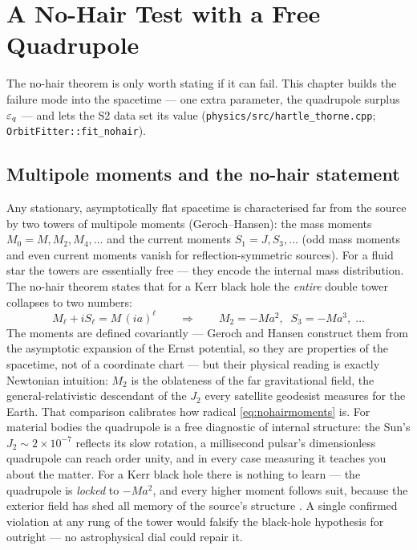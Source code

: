 \chapter{A No-Hair Test with a Free Quadrupole}
\label{ch:nohair}

The no-hair theorem is only worth stating if it can fail. This chapter
builds the failure mode into the spacetime — one extra parameter, the
quadrupole surplus $\varepsilon_q$ — and lets the S2 data set its value
(\texttt{physics/src/hartle\_thorne.cpp};
\texttt{OrbitFitter::fit\_nohair}).

\section{Multipole moments and the no-hair statement}
\label{sec:multipoles}

Any stationary, asymptotically flat spacetime is characterised far from
the source by two towers of multipole moments (Geroch--Hansen): the mass
moments $M_0 = M, M_2, M_4, \dots$ and the current moments
$S_1 = J, S_3, \dots$ (odd mass moments and even current moments vanish
for reflection-symmetric sources). For a fluid star the towers are
essentially free — they encode the internal mass distribution. The
no-hair theorem states that for a Kerr black hole the \emph{entire}
double tower collapses to two numbers:
\begin{equation}
M_\ell + i S_\ell = M\,(ia)^\ell
\qquad\Longrightarrow\qquad
M_2 = -M a^2,\;\; S_3 = -M a^3,\;\dots
\label{eq:nohairmoments}
\end{equation}
The moments are defined covariantly — Geroch and Hansen construct them
from the asymptotic expansion of the Ernst potential, so they are
properties of the spacetime, not of a coordinate chart — but their
physical reading is exactly Newtonian intuition: $M_2$ is the
oblateness of the far gravitational field, the general-relativistic
descendant of the $J_2$ every satellite geodesist measures for the
Earth. That comparison calibrates how radical \eqref{eq:nohairmoments}
is. For material bodies the quadrupole is a free diagnostic of internal
structure: the Sun's $J_2 \sim 2\times10^{-7}$ reflects its slow
rotation, a millisecond pulsar's dimensionless quadrupole can reach
order unity, and in every case measuring it teaches you about the
matter. For a Kerr black hole there is nothing to learn — the
quadrupole is \emph{locked} to $-Ma^2$, and every higher moment
follows suit, because the exterior field has shed all memory of the
source's structure \citep{Psaltis2016}. A single confirmed violation
at any rung of the tower would falsify the black-hole hypothesis for
\sgra{} outright — no astrophysical dial could repair it.

